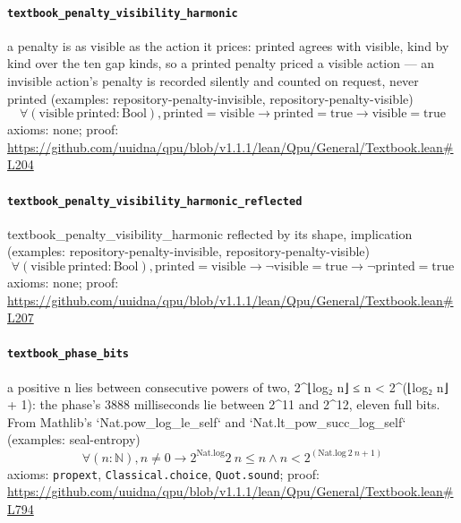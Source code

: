 \documentclass[11pt]{article}
\begin{document}
\paragraph{\texttt{textbook\_penalty\_visibility\_harmonic}}
a penalty is as visible as the action it prices: printed agrees with visible, kind by kind over the ten gap kinds, so a printed penalty priced a visible action — an invisible action's penalty is recorded silently and counted on request, never printed (examples: repository-penalty-invisible, repository-penalty-visible)
\[ \forall (\mathrm{visible}\ \mathrm{printed} : \mathrm{Bool}), \mathrm{printed} = \mathrm{visible} \to \mathrm{printed} = \mathrm{true} \to \mathrm{visible} = \mathrm{true} \]
\noindent axioms: none; proof: \url{https://github.com/uuidna/qpu/blob/v1.1.1/lean/Qpu/General/Textbook.lean\#L204}

\paragraph{\texttt{textbook\_penalty\_visibility\_harmonic\_reflected}}
textbook\_penalty\_visibility\_harmonic reflected by its shape, implication (examples: repository-penalty-invisible, repository-penalty-visible)
\[ \forall (\mathrm{visible}\ \mathrm{printed} : \mathrm{Bool}), \mathrm{printed} = \mathrm{visible} \to \neg \mathrm{visible} = \mathrm{true} \to \neg \mathrm{printed} = \mathrm{true} \]
\noindent axioms: none; proof: \url{https://github.com/uuidna/qpu/blob/v1.1.1/lean/Qpu/General/Textbook.lean\#L207}

\paragraph{\texttt{textbook\_phase\_bits}}
a positive n lies between consecutive powers of two, 2\^{}⌊log₂ n⌋ ≤ n < 2\^{}(⌊log₂ n⌋ + 1): the phase's 3888 milliseconds lie between 2\^{}11 and 2\^{}12, eleven full bits. From Mathlib's `Nat.pow\_log\_le\_self` and `Nat.lt\_pow\_succ\_log\_self` (examples: seal-entropy)
\[ \forall (n : \mathbb{N}), n \ne 0 \to 2 ^{\mathrm{Nat.log}} 2\ n \le n \land n < 2 ^{(\mathrm{Nat.log}\ 2\ n + 1)} \]
\noindent axioms: \texttt{propext}, \texttt{Classical.choice}, \texttt{Quot.sound}; proof: \url{https://github.com/uuidna/qpu/blob/v1.1.1/lean/Qpu/General/Textbook.lean\#L794}
\end{document}
